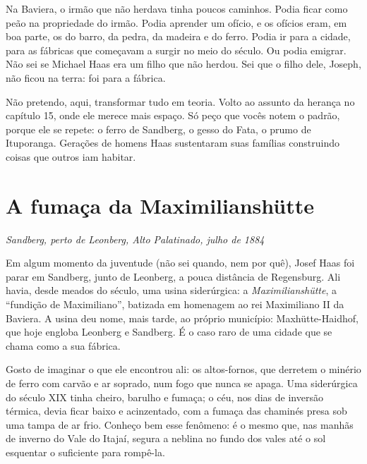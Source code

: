 \documentclass[
  brazilian,
  11pt,
  openany]{book}
\begin{document}
Na Baviera, o irmão que não herdava tinha poucos caminhos. Podia ficar
como peão na propriedade do irmão. Podia aprender um ofício, e os
ofícios eram, em boa parte, os do barro, da pedra, da madeira e do
ferro. Podia ir para a cidade, para as fábricas que começavam a surgir
no meio do século. Ou podia emigrar. Não sei se Michael Haas era um
filho que não herdou. Sei que o filho dele, Joseph, não ficou na terra:
foi para a fábrica.

Não pretendo, aqui, transformar tudo em teoria. Volto ao assunto da
herança no capítulo 15, onde ele merece mais espaço. Só peço que vocês
notem o padrão, porque ele se repete: o ferro de Sandberg, o gesso do
Fata, o prumo de Ituporanga. Gerações de homens Haas sustentaram suas
famílias construindo coisas que outros iam habitar.

\section{A fumaça da
Maximilianshütte}\label{a-fumauxe7a-da-maximilianshuxfctte}

\emph{Sandberg, perto de Leonberg, Alto Palatinado, julho de 1884}

Em algum momento da juventude (não sei quando, nem por quê), Josef Haas
foi parar em Sandberg, junto de Leonberg, a pouca distância de
Regensburg. Ali havia, desde meados do século, uma usina siderúrgica: a
\emph{Maximilianshütte}, a ``fundição de Maximiliano'', batizada em
homenagem ao rei Maximiliano II da Baviera. A usina deu nome, mais
tarde, ao próprio município: Maxhütte-Haidhof, que hoje engloba Leonberg
e Sandberg. É o caso raro de uma cidade que se chama como a sua fábrica.

Gosto de imaginar o que ele encontrou ali: os altos-fornos, que derretem
o minério de ferro com carvão e ar soprado, num fogo que nunca se apaga.
Uma siderúrgica do século XIX tinha cheiro, barulho e fumaça; o céu, nos
dias de inversão térmica, devia ficar baixo e acinzentado, com a fumaça
das chaminés presa sob uma tampa de ar frio. Conheço bem esse fenômeno:
é o mesmo que, nas manhãs de inverno do Vale do Itajaí, segura a neblina
no fundo dos vales até o sol esquentar o suficiente para rompê-la.
\end{document}

